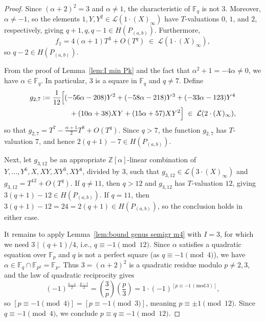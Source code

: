 \documentclass[12pt]{amsart}
\theoremstyle{remark}
\theoremstyle{definition}
\newcommand{\coloneqq}{\mathrel{:=}}
\begin{document}
\begin{proof}
    Since $(\alpha+2)^2 = 3$ and $\alpha \neq 1$, the characteristic of 
    $\mathbb{F}_q$ is not $3$. Moreover, $\alpha \neq -1$, so the elements 
    $1, Y, Y^2 \in \mathcal{L}(1 \cdot (X)_\infty)$ have $T$-valuations 
    $0$, $1$, and $2$, respectively, giving $q+1, q, q-1 \in H(P_{(a,b)})$. 
    Furthermore,
    \[
        f_1 = 4(\alpha+1)T^3 + O(T^q) 
        \;\in\; \mathcal{L}(1 \cdot (X)_\infty),
    \]
    so $q - 2 \in H(P_{(a,b)})$.

    From the proof of Lemma~\ref{lem:I min Pk} and the fact that 
    $\alpha^2 + 1 = -4\alpha \neq 0$, we have $\alpha \in \mathbb{F}_q$. 
    In particular, $3$ is a square in $\mathbb{F}_q$ and $q \neq 7$. Define
    \begin{align*}
        g_{2,7} &\coloneqq \frac{1}{12}\Bigl[
            (-56\alpha - 208)Y^2 
            + (-58\alpha - 218)Y^3 
            + (-33\alpha - 123)Y^4 \\
            &\qquad\qquad 
            + (10\alpha + 38)XY 
            + (15\alpha + 57)XY^2
        \Bigr] \;\in\; \mathcal{L}(2 \cdot (X)_\infty),
    \end{align*}
    so that $g_{2,7} = T^7 - \frac{\alpha+1}{2}T^8 + O(T^q)$. 
    Since $q > 7$, the function $g_{2,7}$ has $T$-valuation $7$, 
    and hence $2(q+1) - 7 \in H(P_{(a,b)})$.

    Next, let $g_{3,12}$ be an appropriate $\mathbb{Z}[\alpha]$-linear 
    combination of $Y, \ldots, Y^6, X, XY, XY^3, XY^4$, divided by $3$, 
    such that $g_{3,12} \in \mathcal{L}(3 \cdot (X)_\infty)$ and 
    $g_{3,12} = T^{12} + O(T^q)$. If $q \neq 11$, then $q > 12$ and 
    $g_{3,12}$ has $T$-valuation $12$, giving 
    $3(q+1) - 12 \in H(P_{(a,b)})$. If $q = 11$, then 
    $3(q+1) - 12 = 24 = 2(q+1) \in H(P_{(a,b)})$, so the conclusion 
    holds in either case.

    It remains to apply Lemma~\ref{lem:bound genus semigr m4} with $I = 3$, 
    for which we need $3 \mid (q+1)/4$, i.e., $q \equiv -1 \pmod{12}$. 
    Since $\alpha$ satisfies a quadratic equation over $\mathbb{F}_p$ and 
    $q$ is not a perfect square (as $q \equiv -1 \pmod 4$), we have 
    $\alpha \in \mathbb{F}_q \cap \mathbb{F}_{p^2} = \mathbb{F}_p$. 
    Thus $3 = (\alpha+2)^2$ is a quadratic residue modulo $p \neq 2, 3$, 
    and the law of quadratic reciprocity gives
    \[
        (-1)^{\frac{3-1}{2} \cdot \frac{p-1}{2}} 
        = \left(\frac{3}{p}\right)\left(\frac{p}{3}\right) 
        = 1 \cdot (-1)^{[p \equiv -1\,(\mathrm{mod}\,3)]},
    \]
    so $[p \equiv -1 \pmod{4}] = [p \equiv -1 \pmod{3}]$, meaning 
    $p \equiv \pm 1 \pmod{12}$. Since $q \equiv -1 \pmod{4}$, we 
    conclude $p \equiv q \equiv -1 \pmod{12}$.
\end{proof}
\end{document}
